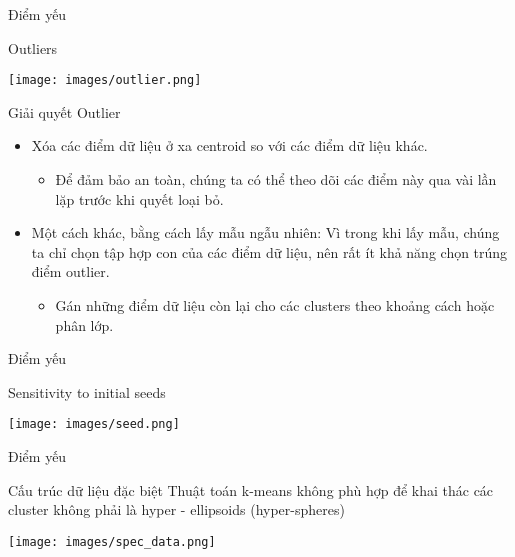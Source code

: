 \documentclass[english,10pt,table]{beamer}
\begin{document}
\begin{frame}{Điểm yếu}
	\begin{block} {Outliers}
	\begin{center}
		\texttt{[image: images/outlier.png]}
	\end{center}
	\end{block}
\end{frame}


\begin{frame}{Giải quyết Outlier}
\begin{itemize}
	\item Xóa các điểm dữ liệu ở xa centroid so với các điểm dữ liệu khác.
	 	\begin{itemize}
	 		\item Để đảm bảo an toàn, chúng ta có thể theo dõi các điểm này qua vài lần lặp trước khi quyết loại bỏ.
	 	\end{itemize}
	\item Một cách khác, bằng cách lấy mẫu ngẫu nhiên: Vì trong khi lấy mẫu, chúng ta chỉ chọn tập hợp con của các điểm dữ liệu, nên rất ít khả năng chọn trúng điểm outlier.
		\begin{itemize}
			\item Gán những điểm dữ liệu còn lại cho các clusters theo khoảng cách hoặc phân lớp.
		\end{itemize}
\end{itemize}
\end{frame}

\begin{frame}{Điểm yếu}
\begin{block} {Sensitivity to initial seeds}
	\begin{center}
		\texttt{[image: images/seed.png]}
	\end{center}
\end{block}
\end{frame}

\begin{frame}{Điểm yếu}
\begin{block} {Cấu trúc dữ liệu đặc biệt}
	Thuật toán k-means không phù hợp để khai thác các cluster không phải là hyper - ellipsoids (hyper-spheres)
	\begin{center}
		\texttt{[image: images/spec\_data.png]}
	\end{center}
\end{block}
\end{frame}
\end{document}
